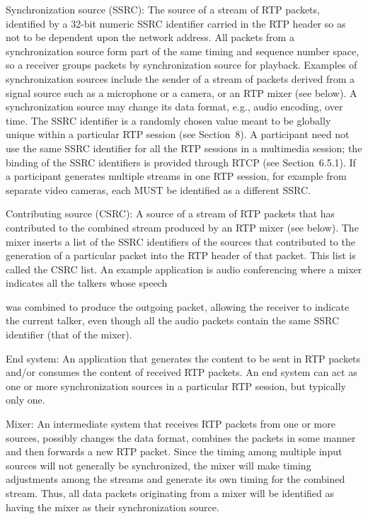 \documentclass{article}
\begin{document}
Synchronization source (SSRC): The source of a stream of RTP packets, identified by a 32-bit numeric SSRC identifier carried in the RTP header so as not to be dependent upon the network address. All packets from a synchronization source form part of the same timing and sequence number space, so a receiver groups packets by synchronization source for playback.  Examples of synchronization sources include the sender of a stream of packets derived from a signal source such as a microphone or a camera, or an RTP mixer (see below).  A synchronization source may change its data format, e.g., audio encoding, over time.  The SSRC identifier is a randomly chosen value meant to be globally unique within a particular RTP session (see Section~8).  A participant need not use the same SSRC identifier for all the RTP sessions in a multimedia session; the binding of the SSRC identifiers is provided through RTCP (see Section~6.5.1).  If a participant generates multiple streams in one RTP session, for example from separate video cameras, each MUST be identified as a different SSRC.

Contributing source (CSRC): A source of a stream of RTP packets that has contributed to the combined stream produced by an RTP mixer (see below).  The mixer inserts a list of the SSRC identifiers of the sources that contributed to the generation of a particular packet into the RTP header of that packet.  This list is called the CSRC list.  An example application is audio conferencing where a mixer indicates all the talkers whose speech

was combined to produce the outgoing packet, allowing the receiver to indicate the current talker, even though all the audio packets contain the same SSRC identifier (that of the mixer).

End system: An application that generates the content to be sent in RTP packets and/or consumes the content of received RTP packets.  An end system can act as one or more synchronization sources in a particular RTP session, but typically only one.

Mixer: An intermediate system that receives RTP packets from one or more sources, possibly changes the data format, combines the packets in some manner and then forwards a new RTP packet.  Since the timing among multiple input sources will not generally be synchronized, the mixer will make timing adjustments among the streams and generate its own timing for the combined stream. Thus, all data packets originating from a mixer will be identified as having the mixer as their synchronization source.
\end{document}
